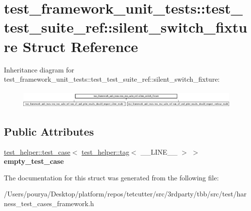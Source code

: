 \hypertarget{structtest__framework__unit__tests_1_1test__test__suite__ref_1_1silent__switch__fixture}{}\section{test\+\_\+framework\+\_\+unit\+\_\+tests\+:\+:test\+\_\+test\+\_\+suite\+\_\+ref\+:\+:silent\+\_\+switch\+\_\+fixture Struct Reference}
\label{structtest__framework__unit__tests_1_1test__test__suite__ref_1_1silent__switch__fixture}
Inheritance diagram for test\+\_\+framework\+\_\+unit\+\_\+tests\+:\+:test\+\_\+test\+\_\+suite\+\_\+ref\+:\+:silent\+\_\+switch\+\_\+fixture\+:\begin{figure}[H]
\begin{center}
\leavevmode
\includegraphics[height=0.928690cm]{structtest__framework__unit__tests_1_1test__test__suite__ref_1_1silent__switch__fixture}
\end{center}
\end{figure}
\subsection*{Public Attributes}
\begin{DoxyCompactItemize}
\item 
\hypertarget{structtest__framework__unit__tests_1_1test__test__suite__ref_1_1silent__switch__fixture_a111e66ec7c5c8d3899ece4ddcd76c2b0}{}\hyperlink{structtest__framework__unit__tests_1_1test__helper_1_1test__case}{test\+\_\+helper\+::test\+\_\+case}$<$ \hyperlink{structtest__framework__unit__tests_1_1test__helper_1_1tag}{test\+\_\+helper\+::tag}$<$ \+\_\+\+\_\+\+L\+I\+N\+E\+\_\+\+\_\+ $>$ $>$ {\bfseries empty\+\_\+test\+\_\+case}\label{structtest__framework__unit__tests_1_1test__test__suite__ref_1_1silent__switch__fixture_a111e66ec7c5c8d3899ece4ddcd76c2b0}

\end{DoxyCompactItemize}


The documentation for this struct was generated from the following file\+:\begin{DoxyCompactItemize}
\item 
/\+Users/pourya/\+Desktop/platform/repos/tetcutter/src/3rdparty/tbb/src/test/harness\+\_\+test\+\_\+cases\+\_\+framework.\+h\end{DoxyCompactItemize}

